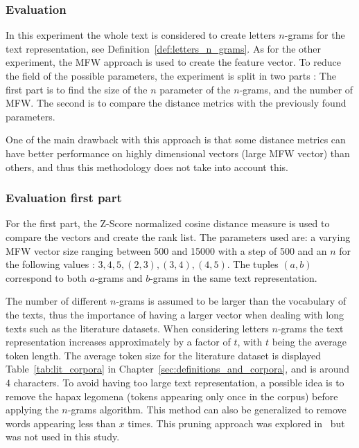 \subsubsection{Evaluation}

In this experiment the whole text is considered to create letters $n$-grams for the text representation, see Definition~\ref{def:letters_n_grams}.
As for the other experiment, the MFW approach is used to create the feature vector.
To reduce the field of the possible parameters, the experiment is split in two parts :
The first part is to find the size of the $n$ parameter of the $n$-grams, and the number of MFW.
The second is to compare the distance metrics with the previously found parameters.

One of the main drawback with this approach is that some distance metrics can have better performance on highly dimensional vectors (large MFW vector) than others, and thus this methodology does not take into account this.

\subsubsection{Evaluation first part}
For the first part, the Z-Score normalized cosine distance measure is used to compare the vectors and create the rank list.
The parameters used are: a varying MFW vector size ranging between 500 and 15000 with a step of 500 and an $n$ for the following values : $3, 4, 5, (2, 3), (3, 4), (4, 5)$.
The tuples $(a, b)$ correspond to both $a$-grams and $b$-grams in the same text representation.

The number of different $n$-grams is assumed to be larger than the vocabulary of the texts, thus the importance of having a larger vector when dealing with long texts such as the literature datasets.
When considering letters $n$-grams the text representation increases approximately by a factor of $t$, with $t$ being the average token length.
The average token size for the literature dataset is displayed Table~\ref{tab:lit_corpora} in Chapter~\ref{sec:definitions_and_corpora}, and is around $4$ characters.
To avoid having too large text representation, a possible idea is to remove the hapax legomena (tokens appearing only once in the corpus) before applying the $n$-grams algorithm.
This method can also be generalized to remove words appearing less than $x$ times.
This pruning approach was explored in~\cite{kocher_linking} but was not used in this study.

